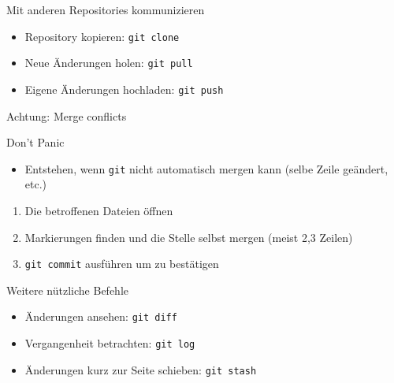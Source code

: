 \begin{frame}{Mit anderen Repositories kommunizieren}
  \begin{itemize}
    \item Repository kopieren: \texttt{git clone}
    \item Neue Änderungen holen: \texttt{git pull}
    \item Eigene Änderungen hochladen: \texttt{git push}
  \end{itemize}
\end{frame}

\begin{frame}{Achtung: Merge conflicts}
  \begin{center}
    \huge Don't Panic
  \end{center}
  \begin{itemize}
    \item Entstehen, wenn \texttt{git} nicht automatisch mergen kann (selbe Zeile geändert, etc.)
  \end{itemize}
  \begin{enumerate}
    \item Die betroffenen Dateien öffnen
    \item Markierungen finden und die Stelle selbst mergen (meist 2,3 Zeilen)
    \item \texttt{git commit} ausführen um zu bestätigen
  \end{enumerate}
\end{frame}

\begin{frame}{Weitere nützliche Befehle}
  \begin{itemize}
    \item Änderungen ansehen: \texttt{git diff}
    \item Vergangenheit betrachten: \texttt{git log}
    \item Änderungen kurz zur Seite schieben: \texttt{git stash}
  \end{itemize}
\end{frame}

